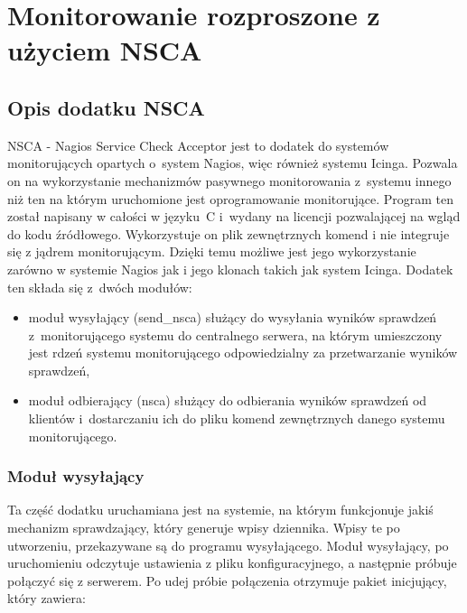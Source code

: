 \chapter{Monitorowanie rozproszone z użyciem NSCA}
\label{chap:nsca}

\section[Opis dodatku NSCA][Opis dodatku NSCA]{Opis dodatku NSCA}

NSCA - Nagios Service Check Acceptor jest to dodatek do systemów
monitorujących opartych o~system Nagios, więc również systemu
Icinga. Pozwala on na wykorzystanie mechanizmów pasywnego
monitorowania z~systemu innego niż ten na którym uruchomione jest
oprogramowanie monitorujące. Program ten został napisany w całości w
języku~C i~wydany na licencji pozwalającej na wgląd do kodu
źródłowego. Wykorzystuje on plik zewnętrznych komend i nie integruje
się z jądrem monitorującym. Dzięki temu możliwe jest jego
wykorzystanie zarówno w systemie Nagios jak i jego klonach takich jak
system Icinga. Dodatek ten składa się z~dwóch modułów:

\begin{itemize}
\item moduł wysyłający (send\_nsca) służący do wysyłania wyników
  sprawdzeń z~monitorującego systemu do centralnego serwera, na którym
  umieszczony jest rdzeń systemu monitorującego odpowiedzialny za
  przetwarzanie wyników sprawdzeń,
\item moduł odbierający (nsca) służący do odbierania wyników sprawdzeń
  od klientów i~dostarczaniu ich do pliku komend zewnętrznych danego
  systemu monitorującego.
\end{itemize}


\subsection[Moduł wysyłający][Moduł wysyłający]{Moduł wysyłający}
\label{subsec:modulWysylajacy}

Ta część dodatku uruchamiana jest na systemie, na którym funkcjonuje
jakiś mechanizm sprawdzający, który generuje wpisy dziennika. Wpisy te
po utworzeniu, przekazywane są do programu wysyłającego. Moduł
wysyłający, po uruchomieniu odczytuje ustawienia z pliku
konfiguracyjnego, a następnie próbuje połączyć się z serwerem. Po udej próbie
połączenia otrzymuje pakiet inicjujący, który zawiera:

